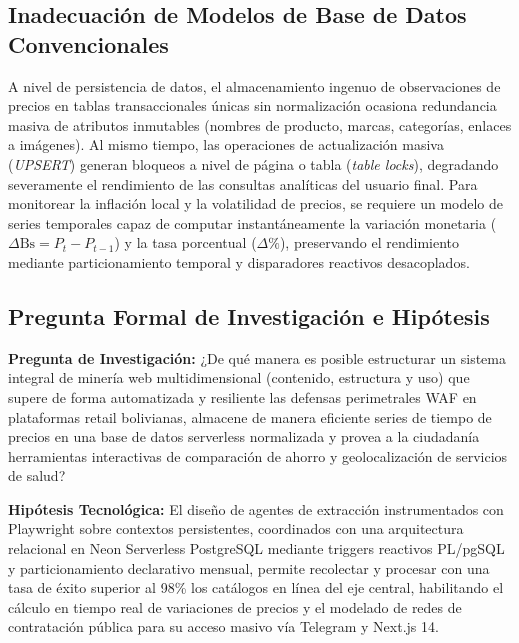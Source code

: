 \subsection{Inadecuación de Modelos de Base de Datos Convencionales}
A nivel de persistencia de datos, el almacenamiento ingenuo de observaciones de precios en tablas transaccionales únicas sin normalización ocasiona redundancia masiva de atributos inmutables (nombres de producto, marcas, categorías, enlaces a imágenes). Al mismo tiempo, las operaciones de actualización masiva (\textit{UPSERT}) generan bloqueos a nivel de página o tabla (\textit{table locks}), degradando severamente el rendimiento de las consultas analíticas del usuario final. Para monitorear la inflación local y la volatilidad de precios, se requiere un modelo de series temporales capaz de computar instantáneamente la variación monetaria ($\Delta\text{Bs} = P_t - P_{t-1}$) y la tasa porcentual ($\Delta\%$), preservando el rendimiento mediante particionamiento temporal y disparadores reactivos desacoplados.

\subsection{Pregunta Formal de Investigación e Hipótesis}

\begin{interpretacionbox}
\textbf{Pregunta de Investigación:}  
¿De qué manera es posible estructurar un sistema integral de minería web multidimensional (contenido, estructura y uso) que supere de forma automatizada y resiliente las defensas perimetrales WAF en plataformas retail bolivianas, almacene de manera eficiente series de tiempo de precios en una base de datos serverless normalizada y provea a la ciudadanía herramientas interactivas de comparación de ahorro y geolocalización de servicios de salud?
\end{interpretacionbox}

\vspace{0.3cm}
\noindent \textbf{Hipótesis Tecnológica:}  
El diseño de agentes de extracción instrumentados con Playwright sobre contextos persistentes, coordinados con una arquitectura relacional en Neon Serverless PostgreSQL mediante triggers reactivos PL/pgSQL y particionamiento declarativo mensual, permite recolectar y procesar con una tasa de éxito superior al 98\% los catálogos en línea del eje central, habilitando el cálculo en tiempo real de variaciones de precios y el modelado de redes de contratación pública para su acceso masivo vía Telegram y Next.js 14.
